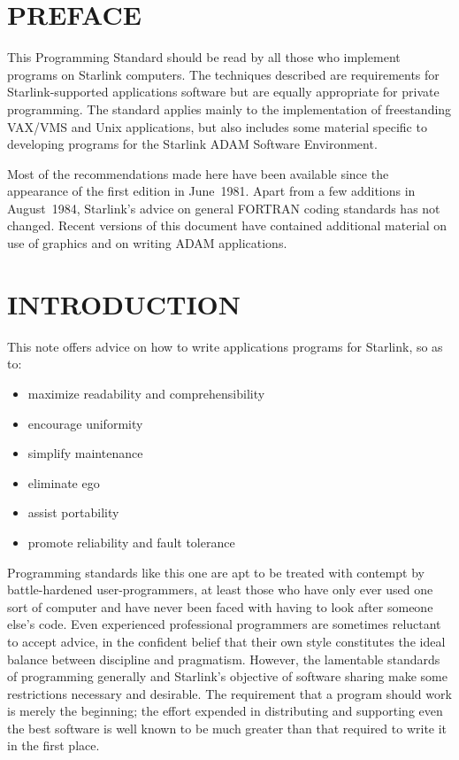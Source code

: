 \documentclass[twoside,11pt,nolof,noabs]{starlink}
\renewcommand{\_}{{\tt\char'137}}
\begin{document}
\scfrontmatter


\section{PREFACE}

This Programming Standard should be read by all those who implement
programs on Starlink computers.  The techniques described are
requirements for Starlink-supported applications software but are equally
appropriate for private programming.  The standard applies mainly
to the implementation of freestanding VAX/VMS and Unix
applications, but also includes some material specific to developing
programs for the Starlink ADAM Software Environment.

Most of the recommendations made here have been available since
the appearance of the first edition in June~1981.
Apart from a few additions in August~1984, Starlink's advice
on general FORTRAN coding standards has not changed.
Recent versions of this document
have contained additional material on use
of graphics and on writing ADAM applications.

\newpage
\section{INTRODUCTION}

This note offers advice on how to write applications programs
for Starlink, so as to:
\begin{itemize}
\item maximize readability and comprehensibility
\item encourage uniformity
\item simplify maintenance
\item eliminate ego
\item assist portability
\item promote reliability and fault tolerance
\end{itemize}
Programming standards like this one are apt to be
treated with contempt by battle-hardened user-programmers,
at least those who have only
ever used one sort of computer and have never been faced with
having to look after someone else's code.  Even experienced professional
programmers are sometimes reluctant to accept advice, in the confident belief
that their own style constitutes the ideal balance between
discipline and pragmatism.
However, the lamentable standards of programming generally and Starlink's
objective of software sharing make some restrictions necessary and desirable.
The requirement that a program should work is merely
the beginning;  the effort expended in distributing and supporting even
the best software is well known to be much greater than that required to
write it in the first place.
\end{document}
